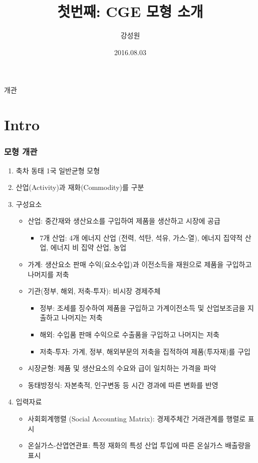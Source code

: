 \documentclass[10pt,compress,slidetop,%
			   hyperref={unicode},xcolor={svgnames},%
			   t]{beamer}
\title %
{첫번째: CGE 모형 소개}
\author{강성원}													%
\institute[KEI] 															%
{KEI}													%
\date 														%
{2016.08.03}																			%
\begin{document}
% 
\begin{frame}
  \titlepage
\end{frame}
%
\begin{frame}{개관}
\tableofcontents
\end{frame}

\section{Intro}

\begin{frame}
	\frametitle{모형 개관}
\begin{enumerate}
\item{축차 동태 1국 일반균형 모형}
\item{산업(Activity)과 재화(Commodity)를 구분}
\item{구성요소}
	\begin{itemize}
	\item{산업: 중간재와 생산요소를 구입하여 제품을 생산하고 시장에 공급}
		\begin{itemize}
		\item{7개 산업: 4개 에너지 산업 (전력, 석탄, 석유, 가스-열), 에너지 집약적 산업, 에너지 비 집약 산업, 농업}
		\end{itemize}
	\item{가계: 생산요소 판매 수익(요소수입)과 이전소득을 재원으로 제품을 구입하고 나머지를 저축}
	\item{기관(정부, 해외, 저축-투자): 비시장 경제주체}
		\begin{itemize}
		\item{정부: 조세를 징수하여 제품을 구입하고 가계이전소득 및 산업보조금을 지출하고 나머지는 저축}
		\item{해외: 수입품 판매 수익으로 수출품을 구입하고 나머지는 저축}
		\item{저축-투자: 가계, 정부, 해외부문의 저축을 집적하여 제품(투자재)를 구입} 
		\end{itemize}
	\item{시장균형: 제품 및 생산요소의 수요와 급이 일치하는 가격을 파악}
	\item{동태방정식: 자본축적, 인구변동 등 시간 경과에 따른 변화를 반영 }
	\end{itemize}
\item{입력자료}
	\begin{itemize}
	\item{사회회계행렬 (Social Accounting Matrix): 경제주체간 거래관계를 행렬로 표시}
	\item{온실가스-산엽연관표: 특정 재화의 특성 산업 투입에 따른 온실가스 배출량을 표시}
	\end{itemize}
\end{enumerate}	

\end{frame}
\end{document}
